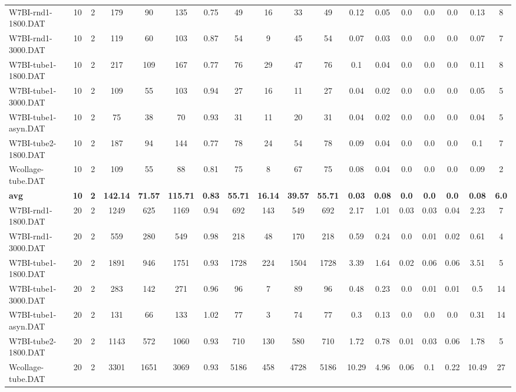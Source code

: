 \begin{sidewaystable}[h]
{\begin{tabular}{lccccccccccccccccc}
W7BI-rnd1-1800.DAT & 10 & 2 & 179 & 90 & 135 & 0.75 & 49 & 16 & 33 & 49 & 0.12 & 0.05 & 0.0 & 0.0 & 0.0 & 0.13 & 8\\
W7BI-rnd1-3000.DAT & 10 & 2 & 119 & 60 & 103 & 0.87 & 54 & 9 & 45 & 54 & 0.07 & 0.03 & 0.0 & 0.0 & 0.0 & 0.07 & 7\\
W7BI-tube1-1800.DAT & 10 & 2 & 217 & 109 & 167 & 0.77 & 76 & 29 & 47 & 76 & 0.1 & 0.04 & 0.0 & 0.0 & 0.0 & 0.11 & 8\\
W7BI-tube1-3000.DAT & 10 & 2 & 109 & 55 & 103 & 0.94 & 27 & 16 & 11 & 27 & 0.04 & 0.02 & 0.0 & 0.0 & 0.0 & 0.05 & 5\\
W7BI-tube1-asyn.DAT & 10 & 2 & 75 & 38 & 70 & 0.93 & 31 & 11 & 20 & 31 & 0.04 & 0.02 & 0.0 & 0.0 & 0.0 & 0.04 & 5\\
W7BI-tube2-1800.DAT & 10 & 2 & 187 & 94 & 144 & 0.77 & 78 & 24 & 54 & 78 & 0.09 & 0.04 & 0.0 & 0.0 & 0.0 & 0.1 & 7\\
Wcollage-tube.DAT & 10 & 2 & 109 & 55 & 88 & 0.81 & 75 & 8 & 67 & 75 & 0.08 & 0.04 & 0.0 & 0.0 & 0.0 & 0.09 & 2\\
\cline{1-18} \textbf{avg} & \textbf{10} & \textbf{2} & \textbf{142.14} & \textbf{71.57} & \textbf{115.71} & \textbf{0.83} & \textbf{55.71} & \textbf{16.14} & \textbf{39.57} & \textbf{55.71} & \textbf{0.03} & \textbf{0.08} & \textbf{0.0} & \textbf{0.0} & \textbf{0.0} & \textbf{0.08} & \textbf{6.0} \\ \cline{1-18}
W7BI-rnd1-1800.DAT & 20 & 2 & 1249 & 625 & 1169 & 0.94 & 692 & 143 & 549 & 692 & 2.17 & 1.01 & 0.03 & 0.03 & 0.04 & 2.23 & 7\\
W7BI-rnd1-3000.DAT & 20 & 2 & 559 & 280 & 549 & 0.98 & 218 & 48 & 170 & 218 & 0.59 & 0.24 & 0.0 & 0.01 & 0.02 & 0.61 & 4\\
W7BI-tube1-1800.DAT & 20 & 2 & 1891 & 946 & 1751 & 0.93 & 1728 & 224 & 1504 & 1728 & 3.39 & 1.64 & 0.02 & 0.06 & 0.06 & 3.51 & 5\\
W7BI-tube1-3000.DAT & 20 & 2 & 283 & 142 & 271 & 0.96 & 96 & 7 & 89 & 96 & 0.48 & 0.23 & 0.0 & 0.01 & 0.01 & 0.5 & 14\\
W7BI-tube1-asyn.DAT & 20 & 2 & 131 & 66 & 133 & 1.02 & 77 & 3 & 74 & 77 & 0.3 & 0.13 & 0.0 & 0.0 & 0.0 & 0.31 & 14\\
W7BI-tube2-1800.DAT & 20 & 2 & 1143 & 572 & 1060 & 0.93 & 710 & 130 & 580 & 710 & 1.72 & 0.78 & 0.01 & 0.03 & 0.06 & 1.78 & 5\\
Wcollage-tube.DAT & 20 & 2 & 3301 & 1651 & 3069 & 0.93 & 5186 & 458 & 4728 & 5186 & 10.29 & 4.96 & 0.06 & 0.1 & 0.22 & 10.49 & 27\\

\end{tabular}}
\end{sidewaystable}
